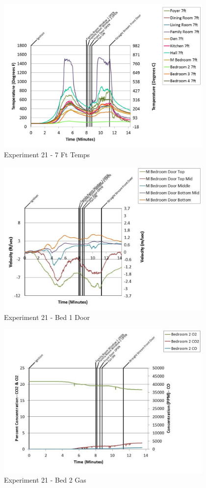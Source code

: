 \documentclass{article}
\begin{document}
\begin{appendices}
	\begin{figure}[h!]
		\centering
		\includegraphics[height=3.05in]{0_Images/Results_Charts/Exp_21_Charts/7FtTemps.pdf}
		\caption{Experiment 21 - 7 Ft Temps}
	\end{figure}
 
	\clearpage

	\begin{figure}[h!]
		\centering
		\includegraphics[height=3.05in]{0_Images/Results_Charts/Exp_21_Charts/Bed1Door.pdf}
		\caption{Experiment 21 - Bed 1 Door}
	\end{figure}
 

	\begin{figure}[h!]
		\centering
		\includegraphics[height=3.05in]{0_Images/Results_Charts/Exp_21_Charts/Bed2Gas.pdf}
		\caption{Experiment 21 - Bed 2 Gas}
	\end{figure}
 

\end{appendices}
\end{document}
